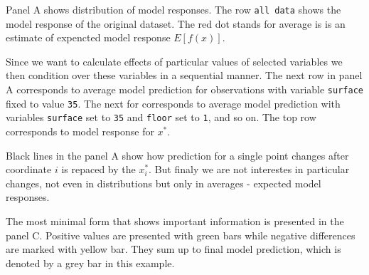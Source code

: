 \documentclass[12pt,]{krantz}
\theoremstyle{definition}
\theoremstyle{definition}
\theoremstyle{definition}
\theoremstyle{remark}
\begin{document}
Panel A shows distribution of model responses. The row
\texttt{all\ data} shows the model response of the original dataset. The
red dot stands for average is is an estimate of expencted model response
\(E [f(x)]\).

Since we want to calculate effects of particular values of selected
variables we then condition over these variables in a sequential manner.
The next row in panel A corresponds to average model prediction for
observations with variable \texttt{surface} fixed to value \texttt{35}.
The next for corresponds to average model prediction with variables
\texttt{surface} set to \texttt{35} and \texttt{floor} set to
\texttt{1}, and so on. The top row corresponds to model response for
\(x^*\).

Black lines in the panel A show how prediction for a single point
changes after coordinate \(i\) is repaced by the \(x^*_i\). But finaly
we are not interestes in particular changes, not even in distributions
but only in averages - expected model responses.

The most minimal form that shows important information is presented in
the panel C. Positive values are presented with green bars while
negative differences are marked with yellow bar. They sum up to final
model prediction, which is denoted by a grey bar in this example.
\end{document}
